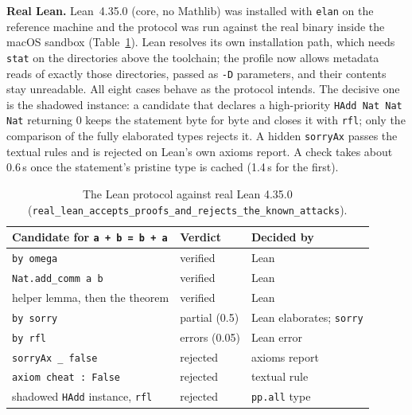 \textbf{Real Lean.} Lean~4.35.0 (core, no Mathlib) was installed with
\texttt{elan} on the reference machine and the protocol was run against the real
binary inside the macOS sandbox (Table~\ref{tab:reallean}). Lean resolves its own
installation path, which needs \texttt{stat} on the directories above the
toolchain; the profile now allows metadata reads of exactly those directories,
passed as \texttt{-D} parameters, and their contents stay unreadable. All eight
cases behave as the protocol intends. The decisive one is the shadowed instance: a
candidate that declares a high-priority \texttt{HAdd Nat Nat Nat} returning 0 keeps
the statement byte for byte and closes it with \texttt{rfl}; only the comparison of
the fully elaborated types rejects it. A hidden \texttt{sorryAx} passes the textual
rules and is rejected on Lean's own axioms report. A check takes about 0.6\,s once
the statement's pristine type is cached (1.4\,s for the first).

\begin{table}[t]
\centering
\caption{The Lean protocol against real Lean 4.35.0 (\texttt{real\_lean\_accepts\_proofs\_and\_rejects\_the\_known\_attacks}).}
\label{tab:reallean}
\scriptsize
\begin{tabular}{@{}lll@{}}
\toprule
Candidate for \texttt{a + b = b + a} & Verdict & Decided by \\
\midrule
\texttt{by omega} & verified & Lean \\
\texttt{Nat.add\_comm a b} & verified & Lean \\
helper lemma, then the theorem & verified & Lean \\
\texttt{by sorry} & partial (0.5) & Lean elaborates; \texttt{sorry} \\
\texttt{by rfl} & errors (0.05) & Lean error \\
\texttt{sorryAx \_ false} & rejected & axioms report \\
\texttt{axiom cheat : False} & rejected & textual rule \\
shadowed \texttt{HAdd} instance, \texttt{rfl} & rejected & \texttt{pp.all} type \\
\bottomrule
\end{tabular}
\end{table}

